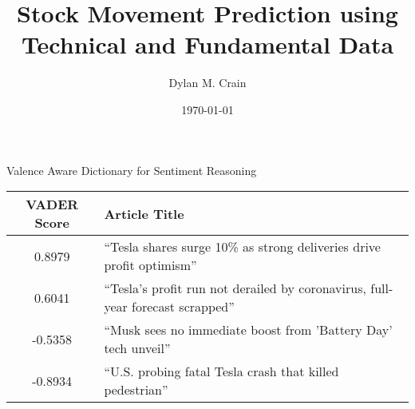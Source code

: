 \documentclass[xcolor=dvipsnames]{beamer}
\title{Stock Movement Prediction using Technical and Fundamental Data}
\author{Dylan M. Crain}
\date{\today}
\begin{document}
\begin{frame}
	\titlepage%
\end{frame}


\begin{frame}{Valence Aware Dictionary for Sentiment Reasoning}
	\centering
	\begin{tabular}{c p{8cm}}
		\toprule
		VADER Score & \hspace{3cm} Article Title\\
		\midrule
		\vspace{0.4cm}
		0.8979 & ``Tesla shares surge 10\% as strong deliveries drive profit
		optimism''\\
		\vspace{0.4cm}
		0.6041 & ``Tesla's profit run not derailed by coronavirus, full-year
		forecast scrapped''\\
		\vspace{0.4cm}
		-0.5358 & ``Musk sees no immediate boost from 'Battery Day' tech
		unveil''\\
		\vspace{0.4cm}
		-0.8934 & ``U.S. probing fatal Tesla crash that killed pedestrian''\\
		\bottomrule
	\end{tabular}
\end{frame}
\end{document}
